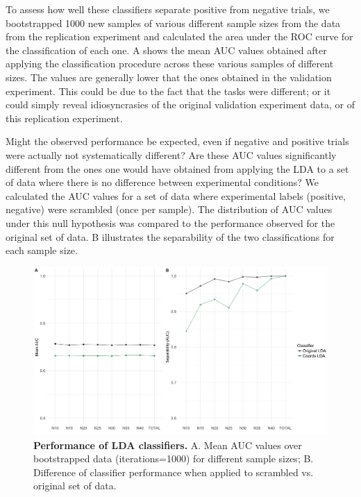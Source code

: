 \documentclass[11pt]{article}
\begin{document}
To assess how well these classifiers separate positive from negative trials, we bootstrapped 1000 new samples of various different sample sizes from the data from the replication experiment and calculated the area under the ROC curve for the classification of each one. 
A shows the mean AUC values obtained after applying the classification procedure across these various samples of different sizes. The values are generally lower that the ones obtained in the validation experiment.
This could be due to the fact that the tasks were different; or it could simply reveal idiosyncrasies of the original validation experiment data, or of this replication experiment.

Might the observed performance be expected, even if negative and positive trials were actually not systematically different?
Are these AUC values significantly different from the ones one would have obtained from applying the LDA to a set of data where there is no difference between experimental conditions?
We calculated the AUC values for a set of data where experimental labels (positive, negative) were scrambled (once per sample).
The distribution of AUC values under this  null hypothesis was compared to the performance observed for the original set of data. B illustrates the separability of the two classifications for each sample size.

\begin{figure}
\centering
\includegraphics[width=\textwidth]{auc_permutation_negation_1.png}
\caption{\textbf{Performance of LDA classifiers.} A. Mean AUC values over bootstrapped data (iterations=1000) for different sample sizes;  B. Difference of classifier performance when applied to scrambled vs. original set of data.}
\label{fig:permutation_AUC_negation}
\end{figure}
\end{document}
